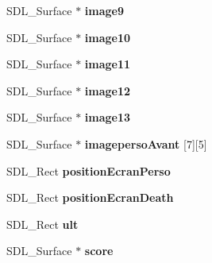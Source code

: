 \begin{DoxyCompactItemize}
\item 
S\+D\+L\+\_\+\+Surface $\ast$ {\bfseries image9}\hypertarget{structPersonne_a1f0c6aa603ef91e1c7fbe699691b96fc}{}\label{structPersonne_a1f0c6aa603ef91e1c7fbe699691b96fc}

\item 
S\+D\+L\+\_\+\+Surface $\ast$ {\bfseries image10}\hypertarget{structPersonne_a0af0082b7015ffe7b50b6ae0f7092443}{}\label{structPersonne_a0af0082b7015ffe7b50b6ae0f7092443}

\item 
S\+D\+L\+\_\+\+Surface $\ast$ {\bfseries image11}\hypertarget{structPersonne_a2e38bb031b6612501c5cdb975026746d}{}\label{structPersonne_a2e38bb031b6612501c5cdb975026746d}

\item 
S\+D\+L\+\_\+\+Surface $\ast$ {\bfseries image12}\hypertarget{structPersonne_a43e16a70610f1b8d47825714167a2f66}{}\label{structPersonne_a43e16a70610f1b8d47825714167a2f66}

\item 
S\+D\+L\+\_\+\+Surface $\ast$ {\bfseries image13}\hypertarget{structPersonne_a1a2f315ab8c30fcbffcebf110d7c7906}{}\label{structPersonne_a1a2f315ab8c30fcbffcebf110d7c7906}

\item 
S\+D\+L\+\_\+\+Surface $\ast$ {\bfseries imageperso\+Avant} \mbox{[}7\mbox{]}\mbox{[}5\mbox{]}\hypertarget{structPersonne_a24eb0c11c2b148042d9c3b99edcdff78}{}\label{structPersonne_a24eb0c11c2b148042d9c3b99edcdff78}

\item 
S\+D\+L\+\_\+\+Rect {\bfseries position\+Ecran\+Perso}\hypertarget{structPersonne_a9b5a3033b6711f5a2a1f988c65473b73}{}\label{structPersonne_a9b5a3033b6711f5a2a1f988c65473b73}

\item 
S\+D\+L\+\_\+\+Rect {\bfseries position\+Ecran\+Death}\hypertarget{structPersonne_ab5332bbd27448198d831a9a00aa473e2}{}\label{structPersonne_ab5332bbd27448198d831a9a00aa473e2}

\item 
S\+D\+L\+\_\+\+Rect {\bfseries ult}\hypertarget{structPersonne_abf3f6484d187990b2230e12ed19dcafe}{}\label{structPersonne_abf3f6484d187990b2230e12ed19dcafe}

\item 
S\+D\+L\+\_\+\+Surface $\ast$ {\bfseries score}\hypertarget{structPersonne_a25fd98485efb9096da557c9a03934eaf}{}\label{structPersonne_a25fd98485efb9096da557c9a03934eaf}


\end{DoxyCompactItemize}
